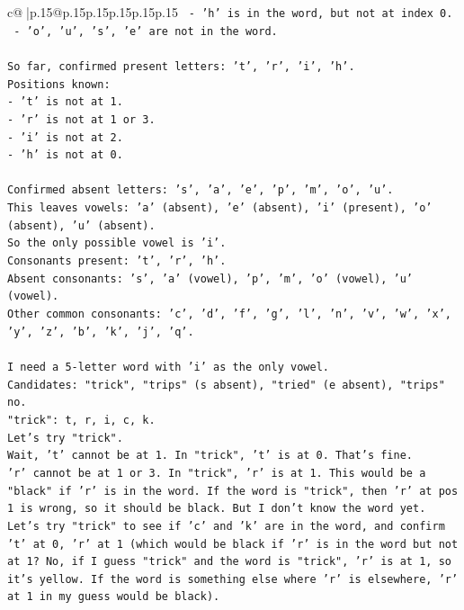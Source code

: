 \documentclass{article}
\begin{document}
{\begin{supertabular}{c@{$\;$}|p{.15\linewidth}@{}p{.15\linewidth}p{.15\linewidth}p{.15\linewidth}p{.15\linewidth}p{.15\linewidth}}
{{{\texttt{   {-} 'h' is in the word, but not at index 0.} \\
\texttt{   {-} 'o', 'u', 's', 'e' are not in the word.} \\
\\ 
\texttt{So far, confirmed present letters: 't', 'r', 'i', 'h'.} \\
\texttt{Positions known:} \\
\texttt{{-} 't' is not at 1.} \\
\texttt{{-} 'r' is not at 1 or 3.} \\
\texttt{{-} 'i' is not at 2.} \\
\texttt{{-} 'h' is not at 0.} \\
\\ 
\texttt{Confirmed absent letters: 's', 'a', 'e', 'p', 'm', 'o', 'u'.} \\
\texttt{This leaves vowels: 'a' (absent), 'e' (absent), 'i' (present), 'o' (absent), 'u' (absent).} \\
\texttt{So the only possible vowel is 'i'.} \\
\texttt{Consonants present: 't', 'r', 'h'.} \\
\texttt{Absent consonants: 's', 'a' (vowel), 'p', 'm', 'o' (vowel), 'u' (vowel).} \\
\texttt{Other common consonants: 'c', 'd', 'f', 'g', 'l', 'n', 'v', 'w', 'x', 'y', 'z', 'b', 'k', 'j', 'q'.} \\
\\ 
\texttt{I need a 5{-}letter word with 'i' as the only vowel.} \\
\texttt{Candidates: "trick", "trips" (s absent), "tried" (e absent), "trips" no.} \\
\texttt{"trick": t, r, i, c, k.} \\
\texttt{Let's try "trick".} \\
\texttt{Wait, 't' cannot be at 1. In "trick", 't' is at 0. That's fine.} \\
\texttt{'r' cannot be at 1 or 3. In "trick", 'r' is at 1. This would be a "black" if 'r' is in the word. If the word is "trick", then 'r' at pos 1 is wrong, so it should be black. But I don't know the word yet.} \\
\texttt{Let's try "trick" to see if 'c' and 'k' are in the word, and confirm 't' at 0, 'r' at 1 (which would be black if 'r' is in the word but not at 1? No, if I guess "trick" and the word is "trick", 'r' is at 1, so it's yellow. If the word is something else where 'r' is elsewhere, 'r' at 1 in my guess would be black).} \\
}}}
\end{supertabular}}
\end{document}
